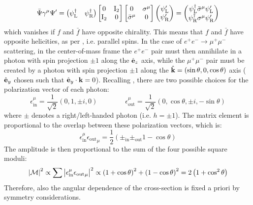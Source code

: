\begin{equation*}
  \bar{\Psi} \gamma^\mu \Psi' =
  \begin{pmatrix}
    \psi_\text{L}^\dagger & \psi_\text{R}^\dagger
  \end{pmatrix}
  \begin{bmatrix}
    0 & \mathrm{I}_2 \\
    \mathrm{I}_2 & 0
  \end{bmatrix}
  \begin{bmatrix}
    0 & \sigma^\mu \\
    \bar{\sigma}^\mu & 0
  \end{bmatrix}
  \begin{pmatrix}
    \psi_\text{L}' \\
    \psi_\text{R}'
  \end{pmatrix}
  =
  \begin{pmatrix}
    \psi_\text{L}^\dagger \bar{\sigma}^\mu \psi_\text{L}' \\
    \psi_\text{R}^\dagger \sigma^\mu \psi_\text{R}'
  \end{pmatrix}
\end{equation*}
which vanishes if $ f $ and $ \bar{f} $ have opposite chirality. This means that $ f $ and $ \bar{f} $ have opposite helicities, as per , i.e. parallel spins. In the case of $ e^+ e^- \rightarrow \mu^+ \mu^- $ scattering, in the center-of-mass frame the $ e^+ e^- $ pair must then annihilate in a photon with spin projection $ \pm 1 $ along the $ \hat{\mathbf{e}}_z $ axis, while the $ \mu^+ \mu^- $ pair must be created by a photon with spin projection $ \pm 1 $ along the $ \hat{\mathbf{k}} = (\sin \theta , 0 , \cos \theta) $ axis ($ \hat{\mathbf{e}}_y $ chosen such that $ \hat{\mathbf{e}}_y \cdot \mathbf{k} = 0 $). Recalling , there are two possible choices for the polarization vector of each photon:
\begin{equation*}
  \epsilon^\mu_\text{in} = \frac{1}{\sqrt{2}} (0, 1, \pm i, 0)
  \qquad \qquad
  \epsilon^\mu_\text{out} = \frac{1}{\sqrt{2}} (0, \cos \theta, \pm i, -\sin \theta)
\end{equation*}
where $ \pm $ denotes a right/left-handed photon (i.e. $ h = \pm 1 $).
The matrix element is proportional to the overlap between these polarization vectors, which is:
\begin{equation*}
  \epsilon^\mu_\text{in} {\epsilon_\text{out}}_\mu = \frac{1}{2} \left( \pm_\text{in} \pm_\text{out} 1 - \cos \theta \right)
\end{equation*}
The amplitude is then proportional to the sum of the four possible square moduli:
\begin{equation}
  \left\lvert\mathcal{M}\right\rvert^2 \propto \sum \left\lvert\epsilon^\mu_\text{in} {\epsilon_\text{out}}_\mu\right\rvert^2 \propto \left( 1 + \cos \theta \right)^2 + \left( 1 - \cos \theta \right)^2 = 2 \left( 1 + \cos^2 \theta \right)
\end{equation}
Therefore, also the angular dependence of the cross-section is fixed a priori by symmetry considerations.










